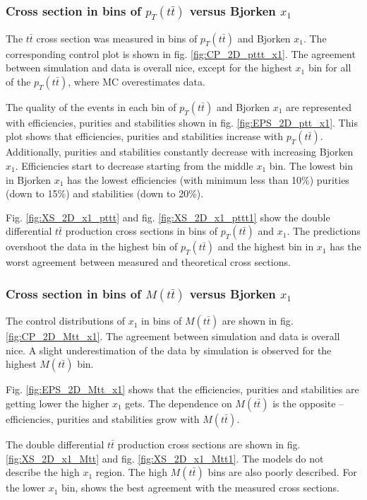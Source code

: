 \subsubsection{Cross section in bins of $p_{T}(t\bar{t})$ versus Bjorken $x_{1}$}

The $t\bar{t}$ cross section was measured in bins of $p_{T}(t\bar{t})$ and Bjorken $x_{1}$.
The corresponding control plot is shown in fig. \ref{fig:CP_2D_pttt_x1}. The agreement between simulation and data is overall nice, except for the highest
$x_{1}$ bin for all of the $p_{T}(t\bar{t})$, where MC overestimates data.

The quality of the events in each bin of $p_{T}(t\bar{t})$ and Bjorken $x_{1}$ are represented with efficiencies, purities and stabilities shown in fig. \ref{fig:EPS_2D_ptt_x1}.
This plot shows that efficiencies, purities and stabilities increase with $p_{T}(t\bar{t})$. Additionally, purities and stabilities constantly decrease with 
increasing Bjorken $x_{1}$. Efficiencies start to decrease starting from the middle $x_{1}$ bin. The lowest bin in Bjorken $x_{1}$ has the lowest efficiencies
(with minimum less than 10\%) purities (down to 15\%) and stabilities (down to 20\%).

Fig. \ref{fig:XS_2D_x1_pttt} and fig. \ref{fig:XS_2D_x1_pttt1} show the double differential $t\bar{t}$ production cross sections in bins of $p_{T}(t\bar{t})$ and $x_{1}$.
The predictions overshoot the data in the highest bin of $p_{T}(t\bar{t})$ and the highest bin in $x_{1}$ has the worst agreement between measured and theoretical
cross sections.

\subsubsection{Cross section in bins of $M(t\bar{t})$ versus Bjorken $x_{1}$}

The control distributions of $x_{1}$ in bins of $M(t\bar{t})$ are shown in fig. \ref{fig:CP_2D_Mtt_x1}. The agreement between simulation and data is overall nice.
A slight underestimation of the data by simulation is observed for the highest $M(t\bar{t})$ bin.

Fig. \ref{fig:EPS_2D_Mtt_x1} shows that the efficiencies, purities and stabilities are getting lower the higher $x_{1}$ gets. The dependence on $M(t\bar{t})$
is the opposite -- efficiencies, purities and stabilities grow with $M(t\bar{t})$.

The double differential $t\bar{t}$ production cross sections are shown in fig. \ref{fig:XS_2D_x1_Mtt} and fig. \ref{fig:XS_2D_x1_Mtt1}. The models do not describe the high $x_{1}$ region. The 
high $M(t\bar{t})$ bins are also poorly described. For the lower $x_{1}$ bin, \MG shows the best agreement with the measured cross sections.

